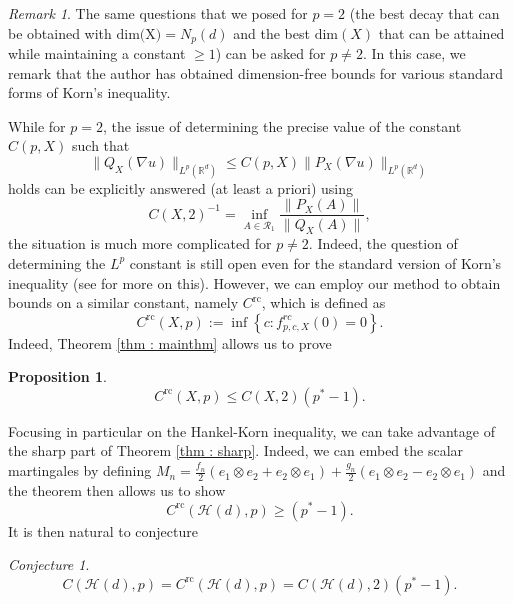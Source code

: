 \documentclass[11pt, a4paper, reqno]{elsarticle}
\newtheorem{proposition}{Proposition}[section]
\theoremstyle{definition}
\theoremstyle{remark}
\newtheorem{remark}{Remark}
\newtheorem*{conjecture}{Conjecture}
\begin{document}
\begin{remark}
	The same questions that we posed for $p=2$
	(the best decay that can be obtained with $\text{dim(X)}
	=N_p(d)$ and the best $\mathrm{dim}(X)$ that can be attained
	while maintaining a constant $\ge 1$) can be asked
	for $p\neq 2$. In this case, we remark that the author
	\cite{Cassese} has obtained dimension-free bounds
	for various standard forms of Korn's inequality.
\end{remark}
While for $p=2$, the issue of determining the precise value of
the constant $C(p,X)$ such that
\begin{equation*}
	\|Q_X(\nabla u)\|_{L^p(\mathbb R^d)}
\le
	C(p,X) \|P_X(\nabla u)\|_{L^p(\mathbb R^d)}
\end{equation*}
holds can be explicitly answered (at least a priori)
 using
\begin{equation*}
     C(X,2)^{-1}=\inf_{A\in\mathcal R_1} \frac{\|P_X(A)\|}{
\|Q_X(A)\|},
\end{equation*}
the situation is much more complicated for
$p\neq 2$. Indeed, the question of determining the $L^p$
constant is still open even for the standard version of Korn's
inequality (see \cite{Cassese} for more on this). However,
we can employ our method to obtain bounds on a similar constant,
namely $C^{\mathrm{rc}}$, which is defined as
\begin{equation*}
	C^{\mathrm{rc}}(X,p)
:=
	\inf
	\left\{
		c\colon 
		 f_{p,c,X}^{rc}(0)
	=
		0
	\right\}.
\end{equation*}
Indeed, Theorem \ref{thm : mainthm} allows us to prove
\begin{proposition}
\begin{equation*}
	C^{\mathrm{rc}}(X,p)
\le
	C(X,2)(p^*-1).
\end{equation*}
\end{proposition} 
Focusing in particular on the Hankel-Korn inequality,
we can take advantage
of the  sharp part of Theorem \ref{thm : sharp}.
Indeed, we can embed the scalar martingales by defining 
$M_n=\frac{f_n}2 (e_1\otimes e_2+e_2\otimes e_1)+\frac{g_n}
2(e_1\otimes e_2-e_2\otimes e_1)$
and the theorem then allows us to show 
\begin{equation*}
	C^{\mathrm{rc}}(\mathcal H(d), p)
\ge
	(p^*-1).
\end{equation*}
It is then natural to conjecture
\begin{conjecture}
\begin{equation}
	C(\mathcal H(d),p)
=
	C^{\mathrm{rc}}(\mathcal H(d),p)
=
	C(\mathcal H(d),2)(p^*-1).
\end{equation}
\end{conjecture}
\end{document}
